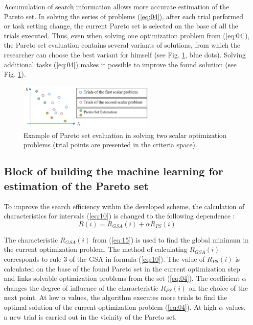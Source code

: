 \documentclass[runningheads]{llncs}
\begin{document}
Accumulation of search information allows more accurate estimation of the Pareto set. In solving the series of problems (\ref{eq:04}), after each trial performed or task setting change, the current Pareto set is selected on the base of all the trials executed. Thus, even when solving one optimization problem from (\ref{eq:04}), the Pareto set evaluation contains several variants of solutions, from which the researcher can choose the best variant for himself (see Fig. \ref{fig2}, blue dots). Solving additional tasks (\ref{eq:04}) makes it possible to improve the found solution (see Fig. \ref{fig2}).

\begin{figure}
\center
\includegraphics[width=0.6\textwidth]{fig2.png}
\caption{Example of Pareto set evaluation in solving two scalar optimization problems (trial points are presented in the criteria space).} \label{fig2}
\end{figure}


\subsection{Block of  building the machine learning for estimation of the Pareto set}
\label{subsec34}

To improve the search efficiency within the developed scheme, the calculation of characteristics for intervals (\ref{eq:10}) is changed to the following dependence \cite{Konnov2025}:
\begin{equation}
    \label{eq:15}
    R(i) = R_{GSA} (i) +  \alpha R_{PS} (i)
\end{equation}

The characteristic $R_{GSA}(i)$ from (\ref{eq:15}) is used to find the global minimum in the current optimization problem. The method of calculating $R_{GSA}(i)$ corresponds to rule 3 of the GSA in formula (\ref{eq:10}). The value of $R_{PS}(i)$ is calculated on the base of the found Pareto set in the current optimization step and links solvable optimization problems from the set (\ref{eq:04}). The coefficient $\alpha$ changes the degree of influence of the characteristic  $R_{PS}(i)$ on the choice of the next point. At low $\alpha$ values, the algorithm executes more trials to find the optimal solution of the current optimization problem (\ref{eq:04}). At high $\alpha$ values, a new trial is carried out in the vicinity of the Pareto set. 
\end{document}
